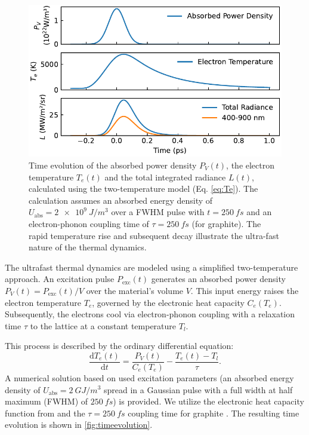 \documentclass[
	a4paper,
]{scrarticle}
\begin{document}
\begin{figure}[b]
    \centering
    \includegraphics{../analysis/figures/model.time_evolution.pdf}
    \caption{Time evolution of the absorbed power density $P_V(t)$, the electron temperature $T_e(t)$ and the total integrated radiance $L(t)$, calculated using the two-temperature model (Eq. \ref{eq:Te}). The calculation assumes an absorbed energy density of $U_{\text{abs}} = \SI{2e9}{J/m^3}$ over a FWHM pulse with $t=\SI{250}{fs}$ and an electron-phonon coupling time of $\tau=\SI{250}{fs}$ (for graphite). The rapid temperature rise and subsequent decay illustrate the ultra-fast nature of the thermal dynamics.}
    \label{fig:timeevolution}
\end{figure}

The ultrafast thermal dynamics are modeled using a simplified two-temperature approach. An excitation pulse $P_{\text{exc}}(t)$ generates an absorbed power density $P_V(t) = P_{\text{exc}}(t) / V$ over the material's volume $V$. This input energy raises the electron temperature $T_e$, governed by the electronic heat capacity $C_e(T_e)$. Subsequently, the electrons cool via electron-phonon coupling with a relaxation time $\tau$ to the lattice at a constant temperature $T_l$.

This process is described by the ordinary differential equation:
\begin{equation}
    \frac{\mathrm d T_e(t)}{\mathrm d t}
    =
    \frac{P_V(t)}{C_e(T_e)}
    -\frac{T_e(t) - T_l}{\tau}.
    \label{eq:Te}
\end{equation}
A numerical solution based on used excitation parameters (an absorbed energy density of $U_{\text{abs}} = \SI{2}{GJ/m^3}$ spread in a Gaussian pulse with a full width at half maximum (FWHM) of $\SI{250}{fs}$) is provided. We utilize the electronic heat capacity function from \cite{nihiraTemperatureDependenceLattice2003} and the $\tau=\SI{250}{fs}$ coupling time for graphite \cite{stangeHotElectronCooling2015}. The resulting time evolution is shown in \autoref{fig:timeevolution}.
\end{document}
